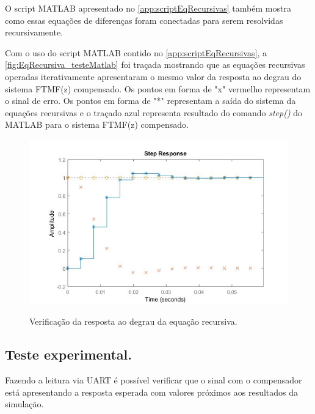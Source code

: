 \documentclass[
	article,			%
	11pt,				%
	oneside,			%
	a4paper,			%
	english,			%
	brazil,				%
	sumario=tradicional
	]{abntex2}
\begin{document}
O script MATLAB apresentado no \autoref{app:scriptEqRecursivas} também mostra como essas equações de diferenças foram conectadas para serem resolvidas recursivamente. 

\pagebreak

Com o uso do script MATLAB contido no \autoref{app:scriptEqRecursivas}, a \autoref{fig:EqRecursiva_testeMatlab} foi traçada mostrando que as equações recursivas operadas iterativamente apresentaram o mesmo valor da resposta ao degrau do sistema FTMF(z) compensado.
Os pontos em forma de "x" vermelho representam o sinal de erro. Os pontos em forma de "*" representam a saída do sistema da equações recursivas e o traçado azul representa resultado do comando \textit{step()} do MATLAB para o sistema FTMF(z) compensado.

\begin{figure}[htb!]
	\centering
	\caption{Verificação da resposta ao degrau da equação recursiva.}
	\includegraphics[scale=0.7]{./img/EqRecursiva_testeMatlab.jpg}
	\label{fig:EqRecursiva_testeMatlab}
\end{figure}

\pagebreak

\subsection{Teste experimental.}

Fazendo a leitura via UART é possível verificar que o sinal com o compensador está apresentando a resposta esperada com valores próximos aos resultados da simulação.
\end{document}
